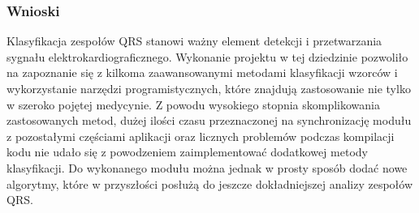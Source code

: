 \subsubsection{Wnioski}
Klasyfikacja zespołów QRS stanowi ważny element detekcji i przetwarzania sygnału elektrokardiograficznego.  Wykonanie projektu w tej dziedzinie pozwoliło na zapoznanie się z kilkoma zaawansowanymi metodami klasyfikacji wzorców i wykorzystanie narzędzi programistycznych, które znajdują zastosowanie nie tylko w szeroko pojętej medycynie.
\newline \newline Z powodu wysokiego stopnia skomplikowania zastosowanych metod, dużej ilości czasu przeznaczonej na synchronizację modułu z pozostałymi częściami aplikacji oraz licznych problemów podczas kompilacji kodu nie udało się z powodzeniem zaimplementować dodatkowej metody klasyfikacji. Do wykonanego modułu można jednak w prosty sposób dodać nowe algorytmy, które w przyszłości posłużą do jeszcze dokładniejszej analizy zespołów QRS.